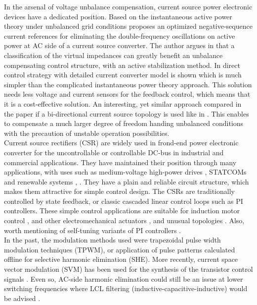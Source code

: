 In the arsenal of voltage unbalance compensation, current source power electronic devices have a dedicated position. Based on the instantaneous active power theory under unbalanced  grid conditions \cite{wang2016dc} proposes an optimized negative-sequence current  references  for  eliminating  the double-frequency  oscillations  on  active  power  at  AC  side of a current source converter. The author argues in \cite{wang2014virtual} that a classification of the virtual impedances can greatly benefit an unbalance compensating control structure, with an active stabilization method. In \cite{guo2018advanced} direct control strategy with detailed current converter model is shown which is much simpler than the complicated instantaneous power theory approach. This solution needs less voltage and current sensors for the feedback control, which means that it is a cost-effective solution. An interesting, yet similar approach compared in the paper if a bi-directional current source topology is used like in \cite{vekhande2015control}. This enables to compensate a much larger degree of freedom handing unbalanced conditions with the precaution of unstable operation possibilities.\\

Current source rectifiers (CSR) are widely used in frond-end power electronic converter for the uncontrollable or controllable DC-bus in industrial and commercial applications. They have maintained their position through many applications, with uses such as medium-voltage high-power drives \cite{vajda2017limiting}, \cite{ghalem2010six} STATCOMs \cite{gupta2014two} and renewable systems \cite{chen2016single}, \cite{exposto2015predictive}. They have a plain and reliable circuit structure, which makes them attractive for simple control design. The CSRs are traditionally controlled by state feedback, or classic cascaded linear control loops such as PI controllers. These simple control applications are suitable for induction motor control \cite{chebre2011speed}, and other electromechanical actuators \cite{salloum2014robust}, and unusual topologies \cite{neukirchner2017voltage}. Also, worth mentioning of self-tuning variants of PI controllers \cite{tahri2012digital}.\\

 In the past, the modulation methods used were trapezoidal pulse width modulation techniques (TPWM), or application of pulse patterns calculated offline for selective harmonic elimination (SHE). More recently, current space vector modulation (SVM) has been used for the synthesis of the transistor control signals \cite{gao2017model}. Even so, AC-side harmonic elimination could still be an issue at lower switching frequencies where LCL filtering (inductive-capacitive-inductive) would be advised \cite{han2010control}.\\

